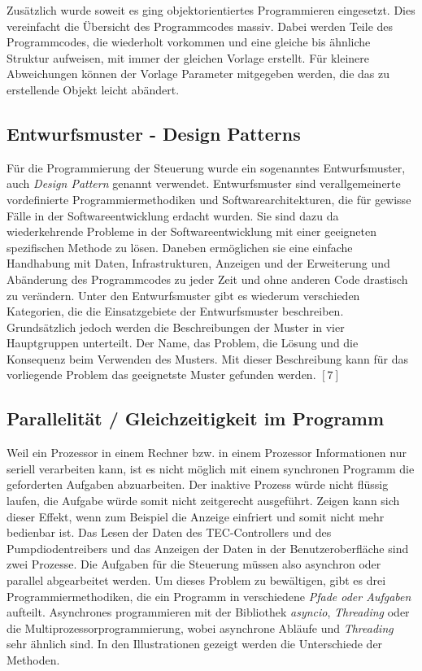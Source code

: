 Zusätzlich wurde soweit es ging objektorientiertes Programmieren eingesetzt. Dies vereinfacht die Übersicht des Programmcodes massiv. Dabei werden Teile des Programmcodes, die wiederholt vorkommen und eine gleiche bis ähnliche Struktur aufweisen, mit immer der gleichen Vorlage erstellt. Für kleinere Abweichungen können der Vorlage Parameter mitgegeben werden, die das zu erstellende Objekt leicht abändert.

\subsection{Entwurfsmuster - Design Patterns}
Für die Programmierung der Steuerung wurde ein sogenanntes Entwurfsmuster, auch \textit{Design Pattern} genannt verwendet. Entwurfsmuster sind verallgemeinerte vordefinierte Programmiermethodiken und Softwarearchitekturen, die für gewisse Fälle in der Softwareentwicklung erdacht wurden. Sie sind dazu da wiederkehrende Probleme in der Softwareentwicklung mit einer geeigneten spezifischen Methode zu lösen. Daneben ermöglichen sie eine einfache Handhabung mit Daten, Infrastrukturen, Anzeigen und der Erweiterung und Abänderung des Programmcodes zu jeder Zeit und ohne anderen Code drastisch zu verändern. Unter den Entwurfsmuster gibt es wiederum verschieden Kategorien, die die Einsatzgebiete der Entwurfsmuster beschreiben. Grundsätzlich jedoch werden die Beschreibungen der Muster in vier Hauptgruppen unterteilt. Der Name, das Problem, die Lösung und die Konsequenz beim Verwenden des Musters. Mit dieser Beschreibung kann für das vorliegende Problem das geeignetste Muster gefunden werden. $[7]$


\subsection{Parallelität / Gleichzeitigkeit im Programm}
\label{concurrency}
Weil ein Prozessor in einem Rechner bzw. in einem Prozessor Informationen nur seriell verarbeiten kann, ist es nicht möglich mit einem synchronen Programm die geforderten Aufgaben abzuarbeiten. Der inaktive Prozess würde nicht flüssig laufen, die Aufgabe würde somit nicht zeitgerecht ausgeführt. Zeigen kann sich dieser Effekt, wenn zum Beispiel die Anzeige einfriert und somit nicht mehr bedienbar ist. Das Lesen der Daten des TEC-Controllers und des Pumpdiodentreibers und das Anzeigen der Daten in der Benutzeroberfläche sind zwei Prozesse. Die Aufgaben für die Steuerung müssen also asynchron oder parallel abgearbeitet werden. Um dieses Problem zu bewältigen, gibt es drei Programmiermethodiken, die ein Programm in verschiedene \textit{Pfade oder Aufgaben} aufteilt. Asynchrones programmieren mit der Bibliothek \textit{asyncio}, \textit{Threading} oder die Multiprozessorprogrammierung, wobei asynchrone Abläufe und \textit{Threading} sehr ähnlich sind. In den Illustrationen gezeigt werden die Unterschiede der Methoden.

